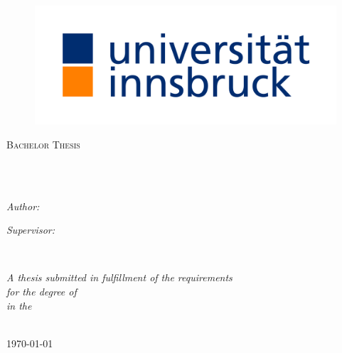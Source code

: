\documentclass[
11pt, %
english, %
singlespacing, %
headsepline, %
]{MastersDoctoralThesis} %
\begin{document}
\begin{titlepage}
\begin{center}

\begin{figure}
  \centering
  \includegraphics[width=0.4\linewidth]{Figures/universitaet-innsbruck-logo-cmyk-farbe.jpg}
\end{figure}

{\scshape\LARGE \univname\par}\vspace{1cm} %
\textsc{\Large Bachelor Thesis}\\[0.5cm] %

\HRule \\[0.4cm] %
{\huge \bfseries \ttitle\par}\vspace{0.4cm} %
\HRule \\[1.5cm] %
 
\begin{minipage}[t]{0.4\textwidth}
\begin{flushleft} \large
\emph{Author:}\\
\authorname %
\end{flushleft}
\end{minipage}
\begin{minipage}[t]{0.4\textwidth}
\begin{flushright} \large
\emph{Supervisor:} \\
\supname %
\end{flushright}
\end{minipage}\\[3cm]
 
\vfill

\large \textit{A thesis submitted in fulfillment of the requirements\\ for the degree of \degreename}\\[0.3cm] %
\textit{in the}\\[0.4cm]
\deptname\\[2cm] %
 
\vfill

{\large \today}\\[4cm] %
 
\vfill
\end{center}
\end{titlepage}
\end{document}
